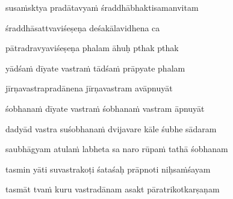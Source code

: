 susa\.msktya pradātavya\.m śraddhābhaktisamanvitam \veg\dontdisplaylinenum

śraddhāsattvaviśeṣeṇa deśakālavidhena ca\thinspace{\dandab} \dontdisplaylinenum

pātradravyaviśeṣeṇa phalam āhuḥ pthak pthak \veg\dontdisplaylinenum

yādśa\.m dīyate vastra\.m tādśa\.m prāpyate phalam\thinspace{\dandab} \dontdisplaylinenum

jīrṇavastrapradānena jīrṇavastram avāpnuyāt \danda\dontdisplaylinenum

śobhana\.m dīyate vastra\.m śobhana\.m vastram āpnuyāt \veg\dontdisplaylinenum

\ujvers\nemsloka 
dadyād vastra suśobhana\.m dvijavare kāle śubhe sādaram
\dontdisplaylinenum

\nemslokab 
saubhāgyam atula\.m labheta sa naro rūpa\.m tathā śobhanam \danda\dontdisplaylinenum

\nemslokac 
tasmin yāti suvastrakoṭi śataśaḥ prāpnoti niḥsa\.mśayam
\dontdisplaylinenum

\nemslokad 
tasmāt tva\.m kuru vastradānam asakt pāratrikotkarṣaṇam \veg\dontdisplaylinenum



